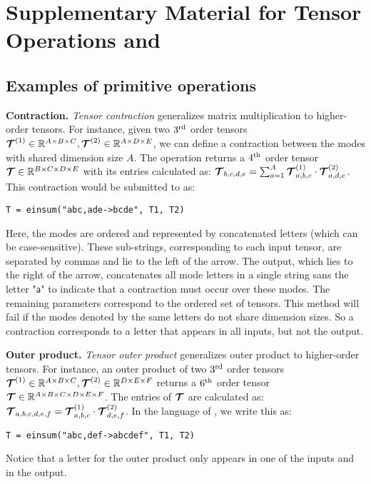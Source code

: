 \section{Supplementary Material for Tensor Operations and \einsum}
\label{app:A1multi}

\subsection{Examples of primitive operations}\label{app:subsec:einsum}

\textbf{Contraction.}
{\em Tensor contraction} generalizes matrix multiplication to higher-order tensors. 
For instance, given two $3^{\mathrm{rd}}$ order tensors $\bm{\mathcal{T}}^{(1)} \in \mathbb{R}^{A \times B \times C}, \bm{\mathcal{T}}^{(2)} \in \mathbb{R}^{A \times D \times E}$, we can define a contraction between the modes with shared dimension size $A$. The operation returns a $4^{\mathrm{th}}$ order tensor $\bm{\mathcal{T}} \in \mathbb{R}^{B \times C \times D \times E}$ with its entries calculated as:
$\bm{\mathcal{T}}_{b,c,d,e} = \sum_{a = 1}^{A}
\bm{\mathcal{T}}^{(1)}_{a,b,c} \cdot \bm{\mathcal{T}}^{(2)}_{a,d,e}$.
This contraction would be submitted to \einsum as:
\begin{lstlisting}
T = einsum("abc,ade->bcde", T1, T2)
\end{lstlisting}
\vspace{-1em}
Here, the modes are ordered and represented by concatenated letters (which can be case-sensitive). These sub-strings, corresponding to each input tensor, are separated by commas and lie to the left of the arrow. The output, which lies to the right of the arrow, concatenates all mode letters in a single string sans the letter $\textsf{"a"}$ to indicate that a contraction must occur over these modes. The remaining parameters correspond to the ordered set of tensors. This method will fail if the modes denoted by the same letters do not share dimension sizes. So a contraction corresponds to a letter that appears in all inputs, but not the output.

\textbf{Outer product.}
{\em Tensor outer product} generalizes outer product to higher-order tensors. For instance, an outer product of two $3^{\mathrm{rd}}$ order tensors $\bm{\mathcal{T}}^{(1)} \in \mathbb{R}^{A \times B \times C}, \bm{\mathcal{T}}^{(2)} \in \mathbb{R}^{D \times E \times F}$ returns a $6^{\mathrm{th}}$ order tensor $\bm{\mathcal{T}} \in \mathbb{R}^{A \times B \times C \times D \times E \times F}$. The entries of $\bm{\mathcal{T}}$ are calculated as:
$\bm{\mathcal{T}}_{a,b,c,d,e,f} =
\bm{\mathcal{T}}^{(1)}_{a,b,c} \cdot
\bm{\mathcal{T}}^{(2)}_{d,e,f}$.
In the language of \einsum, we write this as:
\begin{lstlisting}
T = einsum("abc,def->abcdef", T1, T2)
\end{lstlisting}
\vspace{-1em}
Notice that a letter for the outer product only appears in one of the inputs and in the output.

